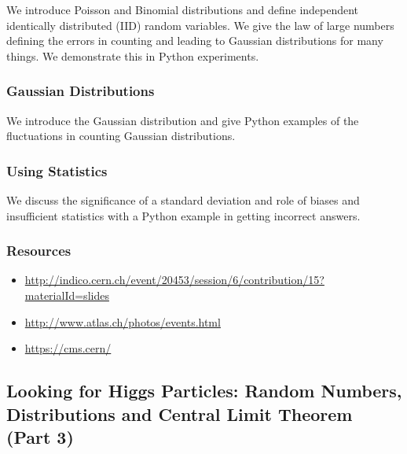 We introduce Poisson and Binomial distributions and define independent
identically distributed (IID) random variables. We give the law of large
numbers defining the errors in counting and leading to Gaussian
distributions for many things. We demonstrate this in Python
experiments.


\subsubsection{Gaussian Distributions}\label{gaussian-distributions}

We introduce the Gaussian distribution and give Python examples of the
fluctuations in counting Gaussian distributions.


\subsubsection{Using Statistics}\label{using-statistics}

We discuss the significance of a standard deviation and role of biases
and insufficient statistics with a Python example in getting incorrect
answers.


\subsubsection{Resources}\label{resources-2}

\begin{itemize}
\tightlist
\item
  \url{http://indico.cern.ch/event/20453/session/6/contribution/15?materialId=slides}
\item
  \url{http://www.atlas.ch/photos/events.html}
\item
  \url{https://cms.cern/}
\end{itemize}

\subsection{Looking for Higgs Particles: Random Numbers, Distributions
and Central Limit Theorem (Part
3)}\label{looking-for-higgs-particles-random-numbers-distributions-and-central-limit-theorem-part-3}

